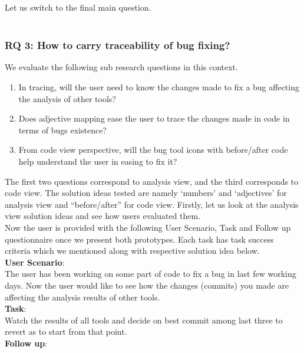 Let us switch to the final main question. \\ \\

\subsubsection{RQ 3: How to carry traceability of bug fixing?}

We evaluate the following sub research questions in this context. \\

\begin{enumerate}
\item In tracing, will the user need to know the changes made to fix a bug affecting the analysis of other tools?
\item Does adjective mapping ease the user to trace the changes made in code in terms of bugs existence?
\item From code view perspective, will the bug tool icons with before/after code help understand the user in easing to fix it?
\end{enumerate}

The first two questions correspond to analysis view, and the third corresponds to code view. The solution ideas tested are namely ‘numbers’ and ‘adjectives’ for analysis view and “before/after” for code view. Firstly, let us look at the analysis view solution ideas and see how users evaluated them. \\

Now the user is provided with the following User Scenario, Task and Follow up questionnaire once we present both prototypes. Each task has task success criteria which we mentioned along with respective solution idea below. \\


\textbf{User Scenario}: \\

The user has been working on some part of code to fix a bug in last few working days. Now the user would like to see how the changes (commits) you made are affecting the analysis results of other tools. \\

\textbf{Task}: \\

Watch the results of all tools and decide on best commit among last three to revert as to start from that point. \\

\textbf{Follow up}: \\

